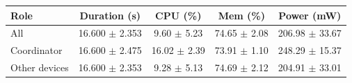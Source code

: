 \begin{tabular}{lcccc}
\hline
\textbf{Role} & \textbf{Duration (s)} & \textbf{CPU (\%)} & \textbf{Mem (\%)} & \textbf{Power (mW)} \\
\hline
All & 16.600 $\pm$ 2.353 & 9.60 $\pm$ 5.23 & 74.65 $\pm$ 2.08 & 206.98 $\pm$ 33.67 \\
Coordinator & 16.600 $\pm$ 2.475 & 16.02 $\pm$ 2.39 & 73.91 $\pm$ 1.10 & 248.29 $\pm$ 15.37 \\
Other devices & 16.600 $\pm$ 2.353 & 9.28 $\pm$ 5.13 & 74.69 $\pm$ 2.12 & 204.91 $\pm$ 33.01 \\
\hline
\end{tabular}

